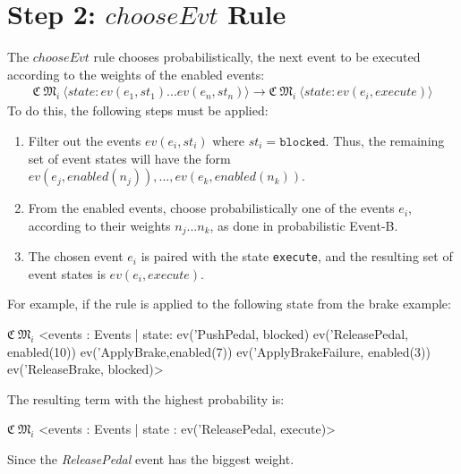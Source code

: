 \section{Step 2: $chooseEvt$ Rule}
The $chooseEvt$ rule chooses probabilistically, the next event to be executed according to the weights of the enabled events:
\begin{align*}
    \mathfrak{C} \ \mathfrak{M}_i \ \langle state: ev(e_1,st_1) ... ev(e_n, st_n) \rangle \rightarrow 
    \mathfrak{C} \ \mathfrak{M}_i \ \langle state: ev(e_i, execute) \rangle
\end{align*}
To do this, the following steps must be applied:
\begin{enumerate}
    \item Filter out the events $ev(e_i, st_i)$ where $st_i = \texttt{blocked}$. Thus, the remaining set of event states will have the form $ev(e_j, enabled(n_j)),...,ev(e_k, enabled(n_k))$.
    \item From the enabled events, choose probabilistically one of the events $e_i$, according to their weights $n_j...n_k$, as done in probabilistic Event-B.
    \item The chosen event $e_i$ is paired with the state \texttt{execute}, and the resulting set of event states is $ev(e_i, execute)$.
\end{enumerate}
For example, if the rule is applied to the following state from the brake example:
\begin{maude}

$\mathfrak{C} \ \mathfrak{M}_i$ <events : Events | state: ev('PushPedal, blocked) 
                               ev('ReleasePedal, enabled(10)) 
                               ev('ApplyBrake,enabled(7)) 
                               ev('ApplyBrakeFailure, enabled(3))
                               ev('ReleaseBrake, blocked)>
\end{maude}
The resulting term with the highest probability is:
\begin{maude}

$\mathfrak{C} \ \mathfrak{M}_i$ <events : Events | state : ev('ReleasePedal, execute)>
\end{maude}
Since the \textit{ReleasePedal} event has the biggest weight.

